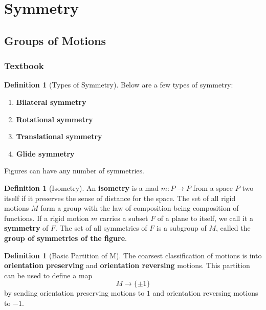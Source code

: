 \documentclass[12pt]{article}
\theoremstyle{definition}
\newtheorem{defn}[thm]{Definition}
\theoremstyle{remark}
\numberwithin{equation}{section}
\newcommand\B[1]{\textbf{ #1}}
\begin{document}
\clearpage

\section{Symmetry}

\subsection{Groups of Motions}

\subsubsection{Textbook}


\begin{defn}[Types of Symmetry]
        Below are a few types of symmetry:\begin{enumerate}
                \item \B{Bilateral symmetry} 
                \item \B{Rotational symmetry}
                \item \B{Translational symmetry}
                \item \B{Glide symmetry}
        \end{enumerate}
        Figures can have any number of symmetries.
\end{defn}

\vspace{15pt}

\begin{defn}[Isometry]
        An \B{isometry} is a mad $m:P\rightarrow P$ from a space $P$ two itself if it preserves the sense of distance for the space. The set of all rigid motions $M$ form a group with the law of composition being composition of functions. If a rigid motion $m$ carries a subset $F$ of a plane to itself, we call it a \B{symmetry} of $F$. The set of all symmetries of $F$ is a subgroup of $M$, called the \B{group of symmetries of the figure}.
\end{defn}

\vspace{15pt}

\begin{defn}[Basic Partition of M]
        The coarsest classification of motions is into \B{orientation preserving} and \B{orientation reversing} motions. This partition can be used to define a map \begin{equation}
                M\rightarrow \{\pm 1\}
        \end{equation}
        by sending orientation preserving motions to $1$ and orientation reversing motions to $-1$.
\end{defn}
\end{document}
